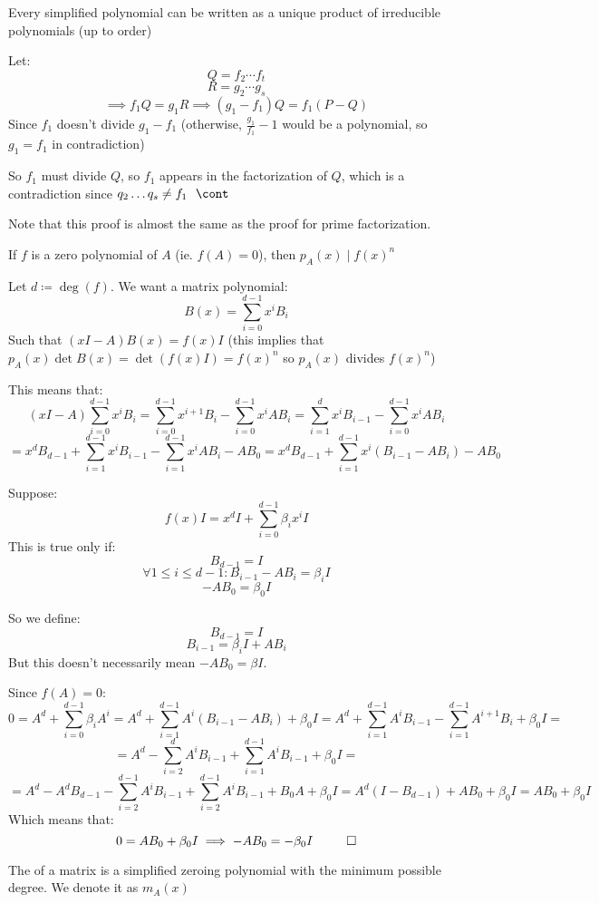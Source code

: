 \documentclass[10pt]{article}
\begin{document}
\begin{lemma}[polyFac]{Every simplified polynomial can be written as a unique product of irreducible polynomials (up to order)}
\begin{itemize}
    Let:
    \[ Q = f_2\cdots f_t \]
    \[ R = g_2\cdots g_s \]
    \[ \implies f_1Q = g_1R \implies (g_1-f_1)Q = f_1(P-Q) \]
    Since $f_1$ doesn't divide $g_1-f_1$ (otherwise, $\frac{g_1}{f_1}-1$ would be a polynomial, so $g_1=f_1$ in contradiction)
    
    So $f_1$ must divide $Q$, so $f_1$ appears in the factorization of $Q$, which is a contradiction since $q_2\dots q_s\neq f_1 ~~ \cont$
\end{itemize}

Note that this proof is almost the same as the proof for prime factorization.

\end{lemma}

\newpage

\begin{lemma}{If $f$ is a zero polynomial of $A$ (ie. $f(A)=0$), then $p_A(x)\mid f(x)^n$}

Let $d\coloneqq \deg(f)$. We want a matrix polynomial:
\[ B(x) = \sum_{i=0}^{d-1} x^iB_i \]
Such that $(xI-A)B(x)=f(x)I$ (this implies that $p_A(x)\det B(x) = \det(f(x)I)=f(x)^n$ so $p_A(x)$ divides $f(x)^n$)

This means that:
\[ (xI-A) \sum_{i=0}^{d-1} x^iB_i = \sum_{i=0}^{d-1} x^{i+1}B_i - \sum_{i=0}^{d-1} x^iAB_i = \sum_{i=1}^d x^iB_{i-1} - \sum_{i=0}^{d-1} x^iAB_i \]
\[ = x^dB_{d-1} + \sum_{i=1}^{d-1} x^iB_{i-1} - \sum_{i=1}^{d-1} x^iAB_i - AB_0 = x^dB_{d-1} + \sum_{i=1}^{d-1} x^i(B_{i-1}-AB_i) - AB_0 \]

Suppose:
\[ f(x)I = x^dI + \sum_{i=0}^{d-1} \beta_ix^iI \]
This is true only if:
\[ B_{d-1} = I \]
\[ \forall 1\leq i\leq d-1: B_{i-1}-AB_i = \beta_i I \]
\[ -AB_0 = \beta_0I \]

So we define:
\[ B_{d-1} = I \]
\[ B_{i-1} = \beta_i I + AB_i \]
But this doesn't necessarily mean $-AB_0=\beta I$.

Since $f(A) = 0$:
\[ 0 = A^d + \sum_{i=0}^{d-1} \beta_iA^i = A^d + \sum_{i=1}^{d-1} A^i(B_{i-1}-AB_i) + \beta_0I= A^d + \sum_{i=1}^{d-1} A^iB_{i-1} - \sum_{i=1}^{d-1} A^{i+1}B_i + \beta_0I = \]
\[ = A^d - \sum_{i=2}^d A^iB_{i-1} + \sum_{i=1}^{d-1} A^iB_{i-1} + \beta_0I = \]
\[ = A^d - A^dB_{d-1} - \sum_{i=2}^{d-1} A^iB_{i-1} + \sum_{i=2}^{d-1} A^iB_{i-1} + B_0A + \beta_0I = A^d(I-B_{d-1}) + AB_0 + \beta_0I = AB_0 + \beta_0I\]
Which means that:
\[ 0 = AB_0 + \beta_0I \implies -AB_0 = -\beta_0 I  ~~ \qed \]

\end{lemma}

\begin{definition}

The  of a matrix is a simplified zeroing polynomial with the minimum possible degree. We denote it as $m_A(x)$

\end{definition}
\end{document}
